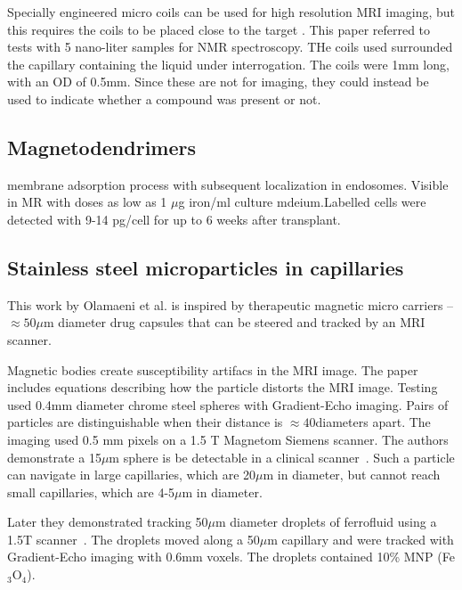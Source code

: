 \documentclass[letterpaper, 10 pt, conference]{ieeeconf}
\begin{document}
 
 Specially engineered micro coils can be used for high resolution MRI imaging, but this requires the coils to be placed close to the target \cite{olson1995high}.  This paper referred to tests with 5 nano-liter samples for NMR spectroscopy.  THe coils used surrounded the capillary containing the liquid under interrogation. The coils were 1mm long, with an OD of 0.5mm. Since these are not for imaging, they could instead be used to indicate whether a compound was present or not.
 
 \subsection{Magnetodendrimers}
 \cite{bulte2001magnetodendrimers}
 
 membrane adsorption process with subsequent localization in endosomes. Visible in MR with doses as low as 1 $\mu$g iron/ml culture mdeium.Labelled cells were detected with 9-14 pg/cell for up to 6 weeks after transplant. 
 

 
 
\subsection{Stainless steel microparticles in capillaries}
This work by Olamaeni et al. \cite{olamaei2011accurate} is inspired by therapeutic magnetic micro carriers -- $\approx 50\mu$m diameter drug capsules that can be steered and tracked by an MRI scanner. 

Magnetic bodies create susceptibility artifacs in the MRI image. The paper\cite{olamaei2011accurate}  includes equations describing how the particle distorts the MRI image.  Testing used 0.4mm diameter chrome steel spheres with Gradient-Echo imaging. Pairs of particles are distinguishable when their distance is $\approx40$diameters apart. The imaging used 0.5 mm pixels on a 1.5 T Magnetom Siemens scanner.  The authors demonstrate a 15$\mu$m sphere is be detectable in a clinical scanner~\cite{olamaei2010mri}. Such a particle can navigate in large capillaries, which are 20$\mu$m in diameter, but cannot reach small capillaries, which are 4-5$\mu$m in diameter.
 
 Later they demonstrated tracking 50$\mu$m diameter droplets of ferrofluid using a 1.5T scanner~\cite{olamaei2013magnetic}.  The droplets moved along a 50$\mu$m capillary and were tracked with Gradient-Echo imaging with 0.6mm voxels.  The droplets contained 10\% MNP (Fe$_\text{3}$O$_{\text{4}}$).
 
\end{document}
